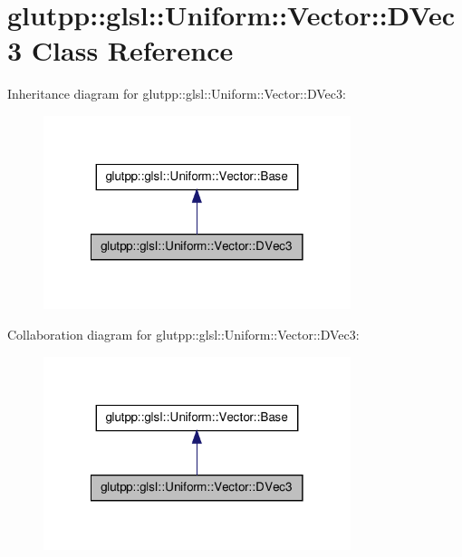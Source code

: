 \hypertarget{classglutpp_1_1glsl_1_1Uniform_1_1Vector_1_1DVec3}{\section{glutpp\-:\-:glsl\-:\-:\-Uniform\-:\-:\-Vector\-:\-:\-D\-Vec3 \-Class \-Reference}
\label{classglutpp_1_1glsl_1_1Uniform_1_1Vector_1_1DVec3}
}


\-Inheritance diagram for glutpp\-:\-:glsl\-:\-:\-Uniform\-:\-:\-Vector\-:\-:\-D\-Vec3\-:
\nopagebreak
\begin{figure}[H]
\begin{center}
\leavevmode
\includegraphics[width=254pt]{classglutpp_1_1glsl_1_1Uniform_1_1Vector_1_1DVec3__inherit__graph}
\end{center}
\end{figure}


\-Collaboration diagram for glutpp\-:\-:glsl\-:\-:\-Uniform\-:\-:\-Vector\-:\-:\-D\-Vec3\-:
\nopagebreak
\begin{figure}[H]
\begin{center}
\leavevmode
\includegraphics[width=254pt]{classglutpp_1_1glsl_1_1Uniform_1_1Vector_1_1DVec3__coll__graph}
\end{center}
\end{figure}
